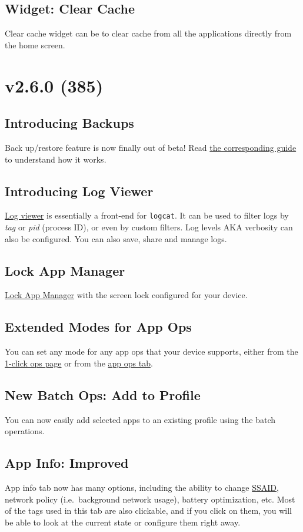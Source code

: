 \subsection{Widget: Clear Cache}
Clear cache widget can be to clear cache from all the applications directly from the home screen.


\section{v2.6.0 (385)}\label{sec:v2.6.0-(385)}

\subsection{Introducing Backups}
Back up/restore feature is now finally out of beta!
Read \hyperref[sec:backup-restore]{the corresponding guide} to understand how it works.

\subsection{Introducing Log Viewer}
\hyperref[subsubsec:log-viewer]{Log viewer} is essentially a front-end for \texttt{logcat}.
It can be used to filter logs by \textit{tag} or \textit{pid} (process ID), or even by custom filters.
Log levels AKA verbosity can also be configured.
You can also save, share and manage logs.

\subsection{Lock App Manager}
\hyperref[subsubsec:screen-lock]{Lock App Manager} with the screen lock configured for your device.

\subsection{Extended Modes for App Ops}
You can set any mode for any app ops that your device supports, either from the
\hyperref[subsec:set-mode-for-app-ops-dots]{1-click ops page} or from the \hyperref[subsubsec:app-ops]{app ops tab}.

\subsection{New Batch Ops: Add to Profile}
You can now easily add selected apps to an existing profile using the batch operations.

\subsection{App Info: Improved}
App info tab now has many options, including the ability to change \hyperref[sec:terminologies]{SSAID}, network policy
(i.e.\ background network usage), battery optimization, etc.
Most of the tags used in this tab are also clickable, and if you click on them, you will be able to look at the current
state or configure them right away.

